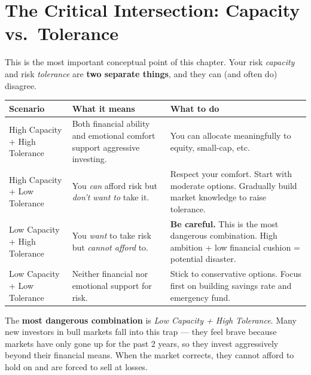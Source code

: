 \documentclass[12pt,a4paper]{article}
\begin{document}
\vspace{3mm}

\section{The Critical Intersection: Capacity vs.\ Tolerance}

This is the most important conceptual point of this chapter. Your risk \textit{capacity} and risk \textit{tolerance} are \textbf{two separate things}, and they can (and often do) disagree.

\begin{center}
\begin{tabular}{B{3.8cm} L{4.5cm} L{5.2cm}}
\toprule
Scenario & What it means & What to do\\
\midrule
{}
High Capacity + High Tolerance
& Both financial ability and emotional comfort support aggressive investing.
& You can allocate meaningfully to equity, small-cap, etc.\\[6pt]

High Capacity + Low Tolerance
& You \textit{can} afford risk but \textit{don't want to} take it.
& Respect your comfort. Start with moderate options. Gradually build market knowledge to raise tolerance.\\[6pt]

Low Capacity + High Tolerance
& You \textit{want} to take risk but \textit{cannot afford} to.
& \textbf{Be careful.} This is the most dangerous combination. High ambition + low financial cushion = potential disaster.\\[6pt]

Low Capacity + Low Tolerance
& Neither financial nor emotional support for risk.
& Stick to conservative options. Focus first on building savings rate and emergency fund.\\
\bottomrule
\end{tabular}
\end{center}

\vspace{3mm}

\begin{warningbox}
The \textbf{most dangerous combination} is \textit{Low Capacity + High Tolerance}. Many new investors in bull markets fall into this trap --- they feel brave because markets have only gone up for the past 2 years, so they invest aggressively beyond their financial means. When the market corrects, they cannot afford to hold on and are forced to sell at losses.
\end{warningbox}
\end{document}

